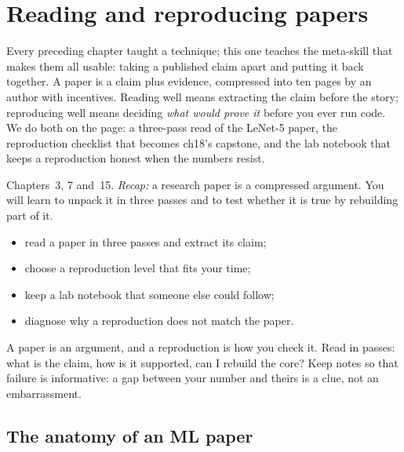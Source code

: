 \chapter{Reading and reproducing papers}
\label{ch:papers}

Every preceding chapter taught a technique; this one teaches the
meta-skill that makes them all usable: taking a published claim
apart and putting it back together. A paper is a claim plus
evidence, compressed into ten pages by an author with incentives.
Reading well means extracting the claim before the story; reproducing
well means deciding \emph{what would prove it} before you ever run
code. We do both on the page: a three-pass read of the LeNet-5
paper, the reproduction checklist that becomes ch18's capstone, and
the lab notebook that keeps a reproduction honest when the numbers
resist.

\begin{rulebox}
Chapters~3, 7 and~15. \emph{Recap:} a research paper is a compressed argument. You will learn to unpack it in three passes and to test whether it is true by rebuilding part of it.
\end{rulebox}
\begin{wins}
\begin{itemize}
\item read a paper in three passes and extract its claim;
\item choose a reproduction level that fits your time;
\item keep a lab notebook that someone else could follow;
\item diagnose why a reproduction does not match the paper.
\end{itemize}
\end{wins}
\begin{principle}
A paper is an argument, and a reproduction is how you check it. Read in passes: what is the claim, how is it supported, can I rebuild the core? Keep notes so that failure is informative: a gap between your number and theirs is a clue, not an embarrassment.
\end{principle}

\section{The anatomy of an ML paper}
\label{sec:anatomy}

